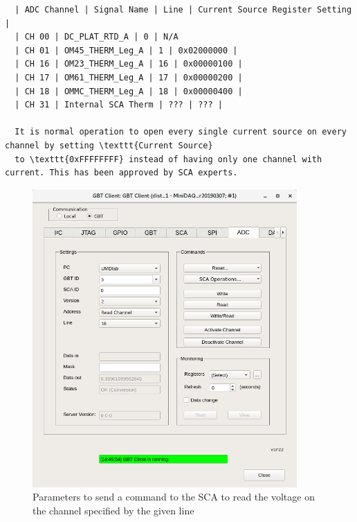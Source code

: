 \begin{lstlisting}
  | ADC Channel | Signal Name | Line | Current Source Register Setting |
  | CH 00 | DC_PLAT_RTD_A | 0 | N/A
  | CH 01 | OM45_THERM_Leg_A | 1 | 0x02000000 |
  | CH 16 | OM23_THERM_Leg_A | 16 | 0x00000100 |
  | CH 17 | OM61_THERM_Leg_A | 17 | 0x00000200 |
  | CH 18 | OMMC_THERM_Leg_A | 18 | 0x00000400 |
  | CH 31 | Internal SCA Therm | ??? | ??? |

  It is normal operation to open every single current source on every channel by setting \texttt{Current Source}
  to \texttt{0xFFFFFFFF} instead of having only one channel with current. This has been approved by SCA experts.
\end{lstlisting}

\begin{figure}[ht]
    \centering
    \includegraphics[width=0.9\textwidth]{res/gbt_client_adc_readout_readchannel.png}
    \caption{
        Parameters to send a command to the SCA to read the voltage on the
        channel specified by the given line
    }
    \label{fig:adc-readout}
\end{figure}
